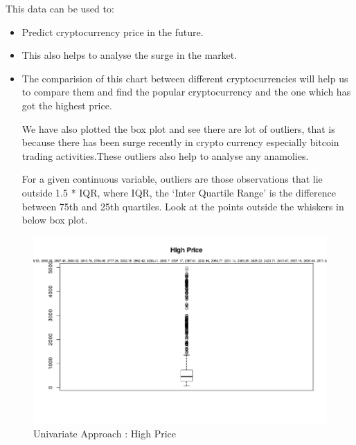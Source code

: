 \documentclass{article}
\begin{document}
This data can be used to:
\begin{itemize}
\item Predict cryptocurrency price in the future.

\item This also helps to analyse the surge in the market.

\item The comparision of this chart between different cryptocurrencies will help us to compare them and find the popular cryptocurrency and the one which has got the highest price.

We have also plotted the box plot and see there are lot of outliers, that is because there has been surge recently in crypto currency especially bitcoin trading activities.These outliers also help to analyse any anamolies. 

For a given continuous variable, outliers are those observations that lie outside 1.5 * IQR, where IQR, the ‘Inter Quartile Range’ is the difference between 75th and 25th quartiles. Look at the points outside the whiskers in below box plot.
\end{itemize}


\begin{figure}
    \centering
    \includegraphics[width=\linewidth]{bitcoin_price_highprice_boxplot}
    \caption{Univariate Approach : High \textunderscore Price}
    \label{fig:my_label}
\end{figure}
\end{document}
